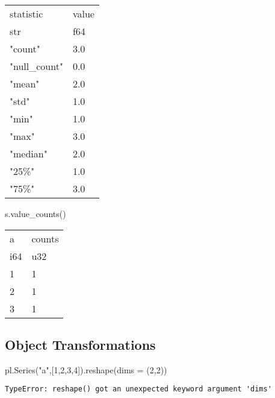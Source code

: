 \documentclass[
  letterpaper,
  DIV=11,
  numbers=noendperiod]{scrartcl}
\newenvironment{Shaded}{\begin{snugshade}}{\end{snugshade}}
\newcommand{\DecValTok}[1]{\textcolor[rgb]{0.68,0.00,0.00}{#1}}
\newcommand{\NormalTok}[1]{\textcolor[rgb]{0.00,0.23,0.31}{#1}}
\newcommand{\OperatorTok}[1]{\textcolor[rgb]{0.37,0.37,0.37}{#1}}
\newcommand{\StringTok}[1]{\textcolor[rgb]{0.13,0.47,0.30}{#1}}
\begin{document}
\begin{longtable}[]{@{}ll@{}}
\toprule()
statistic & value \\
str & f64 \\
\midrule()
\endhead
"count" & 3.0 \\
"null\_count" & 0.0 \\
"mean" & 2.0 \\
"std" & 1.0 \\
"min" & 1.0 \\
"max" & 3.0 \\
"median" & 2.0 \\
"25\%" & 1.0 \\
"75\%" & 3.0 \\
\bottomrule()
\end{longtable}

\begin{Shaded}
\begin{Highlighting}[]
\NormalTok{s.value\_counts()}
\end{Highlighting}
\end{Shaded}

\begin{longtable}[]{@{}ll@{}}
\toprule()
a & counts \\
i64 & u32 \\
\midrule()
\endhead
1 & 1 \\
2 & 1 \\
3 & 1 \\
\bottomrule()
\end{longtable}

\hypertarget{object-transformations}{%
\subsection{Object Transformations}\label{object-transformations}}

\begin{Shaded}
\begin{Highlighting}[]
\NormalTok{pl.Series(}\StringTok{"a"}\NormalTok{,[}\DecValTok{1}\NormalTok{,}\DecValTok{2}\NormalTok{,}\DecValTok{3}\NormalTok{,}\DecValTok{4}\NormalTok{]).reshape(dims }\OperatorTok{=}\NormalTok{ (}\DecValTok{2}\NormalTok{,}\DecValTok{2}\NormalTok{))}
\end{Highlighting}
\end{Shaded}

\begin{verbatim}
TypeError: reshape() got an unexpected keyword argument 'dims'
\end{verbatim}
\end{document}
